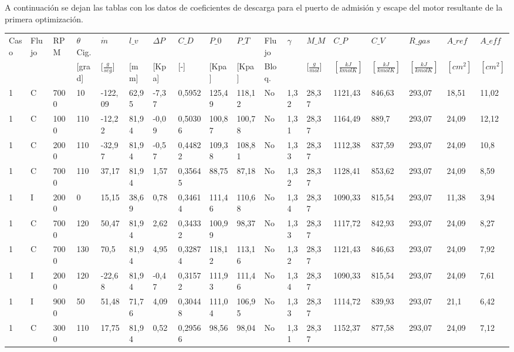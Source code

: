 \label{anexo:1}
A continuación se dejan las tablas con los datos de coeficientes de descarga
para el puerto de admisión y escape del motor resultante de la primera
optimización.

{\tiny
\begin{landscape}
    \begin{longtable}{llllllllllllllllll} \toprule
    Caso & Flujo & RPM & $\theta$ Cig. & $\dot{m}$ & $l\_v$ & $\Delta P$ & $C\_D$ & $P\_0$ & $P\_T$ & Flujo & $\gamma$ & $M\_M$ & $C\_P$ & $C\_V$ & $R\_{gas}$ & $A\_{ref}$ & $A\_{eff}$ \\
     &  &  & [grad] & [$\frac{g}{seg}$] & [mm] & [Kpa] & [-] & [Kpa] & [Kpa] & Bloq. &  & [$\frac{g}{mol}$] & $[\frac{kJ}{kmol K}]$ & $[\frac{kJ}{kmol K}]$ & $[\frac{kJ}{kmol K}]$ & $[cm^2]$ & $[cm^2]$ \\ \midrule
    1 & C & 7000 & 10 & -122,09 & 62,95 & -7,37 & 0,5952 & 125,49 & 118,12 & No & 1,32 & 28,37 & 1121,43 & 846,63 & 293,07 & 18,51 & 11,02 \\
    1 & C & 1000 & 110 & -12,22 & 81,94 & -0,09 & 0,50306 & 100,87 & 100,78 & No & 1,31 & 28,37 & 1164,49 & 889,7 & 293,07 & 24,09 & 12,12 \\
    1 & C & 2000 & 110 & -32,97 & 81,94 & -0,57 & 0,44822 & 109,38 & 108,81 & No & 1,33 & 28,37 & 1112,38 & 837,59 & 293,07 & 24,09 & 10,8 \\
    1 & C & 7000 & 110 & 37,17 & 81,94 & 1,57 & 0,35645 & 88,75 & 87,18 & No & 1,32 & 28,37 & 1128,41 & 853,62 & 293,07 & 24,09 & 8,59 \\
    1 & I & 2000 & 0 & 15,15 & 38,69 & 0,78 & 0,34614 & 111,46 & 110,68 & No & 1,34 & 28,37 & 1090,33 & 815,54 & 293,07 & 11,38 & 3,94 \\
    1 & C & 7000 & 120 & 50,47 & 81,94 & 2,62 & 0,34332 & 100,99 & 98,37 & No & 1,33 & 28,37 & 1117,72 & 842,93 & 293,07 & 24,09 & 8,27 \\
    1 & C & 7000 & 130 & 70,5 & 81,94 & 4,95 & 0,32874 & 118,12 & 113,16 & No & 1,32 & 28,37 & 1121,43 & 846,63 & 293,07 & 24,09 & 7,92 \\
    1 & I & 2000 & 120 & -22,68 & 81,94 & -0,47 & 0,31572 & 111,93 & 111,46 & No & 1,34 & 28,37 & 1090,33 & 815,54 & 293,07 & 24,09 & 7,61 \\
    1 & I & 9000 & 50 & 51,48 & 71,76 & 4,09 & 0,30448 & 111,04 & 106,95 & No & 1,33 & 28,37 & 1114,72 & 839,93 & 293,07 & 21,1 & 6,42 \\
    1 & C & 3000 & 110 & 17,75 & 81,94 & 0,52 & 0,29566 & 98,56 & 98,04 & No & 1,31 & 28,37 & 1152,37 & 877,58 & 293,07 & 24,09 & 7,12 \\

\end{longtable}
\end{landscape}}
